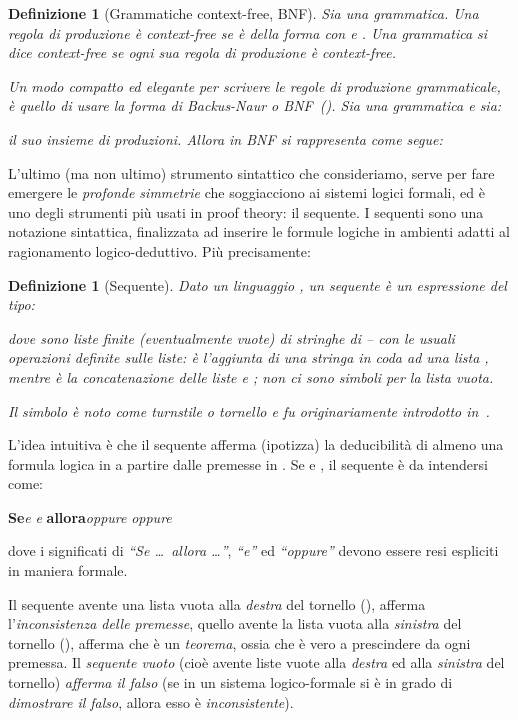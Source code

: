 \documentclass[12pt,a4paper,openright,twoside]{report}
\newtheorem{dfn}[thm]{Definizione}
\begin{document}
\begin{dfn}[Grammatiche context-free, BNF]
Sia  una grammatica. Una \emph{regola di produzione} \`e \emph{context-free} se \`e della forma  con  e . Una \emph{grammatica} si dice \emph{context-free} se ogni sua regola di produzione \`e context-free.

Un modo compatto ed elegante per scrivere le regole di produzione grammaticale, \`e quello di usare la \emph{forma di Backus-Naur} o \mbox{BNF}~(\cite{Bac60}). Sia  una grammatica e sia:

il suo insieme di produzioni. Allora  in BNF si rappresenta come segue:

\end{dfn}


L'ultimo (ma non ultimo) strumento sintattico che consideriamo, serve per fare emergere le \emph{profonde simmetrie} che soggiacciono ai sistemi logici formali, ed \`e uno degli strumenti pi\`u usati in proof theory: il sequente. I sequenti sono una notazione sintattica, finalizzata ad inserire le formule logiche in ambienti adatti al ragionamento logico-deduttivo. Pi\`u precisamente:

\begin{dfn}[Sequente]\label{def:seq}
Dato un linguaggio , un \emph{sequente} \`e un espressione del tipo:

dove  sono \emph{liste finite} (eventualmente vuote) di stringhe di  -- con le usuali operazioni definite sulle liste:  \`e l'aggiunta di una stringa  in coda ad una lista , mentre  \`e la concatenazione delle liste  e ; non ci sono simboli per la lista vuota.

Il simbolo  \`e noto come \emph{turnstile} o \emph{tornello} e fu originariamente introdotto in~\cite{Fre79}.
\end{dfn}

L'idea intuitiva \`e che il sequente afferma (ipotizza) la deducibilit\`a di almeno una formula logica in  a partire dalle premesse in . Se  e , il sequente  \`e da intendersi come:
\begin{center}
	\textbf{Se}\quad  \emph{e}  \emph{e}  \quad\textbf{allora}\quad  \emph{oppure}  \emph{oppure} 
\end{center}
dove i significati di \emph{``Se \ldots~allora \ldots''}, \emph{``e''} ed \emph{``oppure''} devono essere resi espliciti in maniera formale.

Il sequente avente una lista vuota alla \emph{destra} del tornello (), afferma l'\emph{inconsistenza delle premesse}, quello avente la lista vuota alla \emph{sinistra} del tornello (), afferma che  \`e un \emph{teorema}, ossia che \`e vero a prescindere da ogni premessa. Il \emph{sequente vuoto} (cio\`e avente liste vuote alla \emph{destra} ed alla \emph{sinistra} del tornello) \emph{afferma il falso} (se in un sistema logico-formale si \`e in grado di \emph{dimostrare il falso}, allora esso \`e \emph{inconsistente}).
\end{document}
